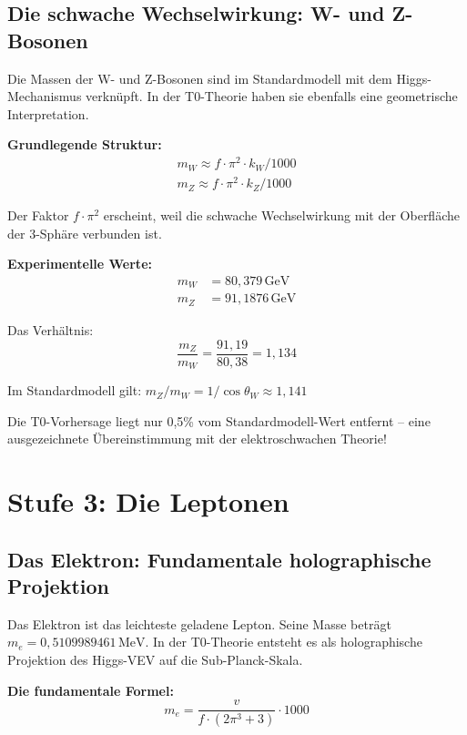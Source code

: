 	\subsection{Die schwache Wechselwirkung: W- und Z-Bosonen}
	
	Die Massen der W- und Z-Bosonen sind im Standardmodell mit dem Higgs-Mechanismus verknüpft. In der T0-Theorie haben sie ebenfalls eine geometrische Interpretation.
	
	\textbf{Grundlegende Struktur:}
	\begin{align}
		\boxed{m_W \approx f \cdot \pi^2 \cdot k_W / 1000} \\
		\boxed{m_Z \approx f \cdot \pi^2 \cdot k_Z / 1000}
	\end{align}
	
	Der Faktor \(f \cdot \pi^2\) erscheint, weil die schwache Wechselwirkung mit der Oberfläche der 3-Sphäre verbunden ist.
	
	\textbf{Experimentelle Werte:}
	\begin{align}
		m_W &= 80{,}379\,\text{GeV} \\
		m_Z &= 91{,}1876\,\text{GeV}
	\end{align}
	
	Das Verhältnis:
	\begin{equation}
		\frac{m_Z}{m_W} = \frac{91{,}19}{80{,}38} = 1{,}134
	\end{equation}
	
	Im Standardmodell gilt: \(m_Z/m_W = 1/\cos\theta_W \approx 1{,}141\)
	
	Die T0-Vorhersage liegt nur 0{,}5\% vom Standardmodell-Wert entfernt -- eine ausgezeichnete Übereinstimmung mit der elektroschwachen Theorie!
	
	\section{Stufe 3: Die Leptonen}
	
	\subsection{Das Elektron: Fundamentale holographische Projektion}
	
	Das Elektron ist das leichteste geladene Lepton. Seine Masse beträgt \(m_e = 0{,}5109989461\,\text{MeV}\). In der T0-Theorie entsteht es als holographische Projektion des Higgs-VEV auf die Sub-Planck-Skala.
	
	\textbf{Die fundamentale Formel:}
	\begin{equation}
		\boxed{m_e = \frac{v}{f \cdot (2\pi^3 + 3)} \cdot 1000}
	\end{equation}
	
